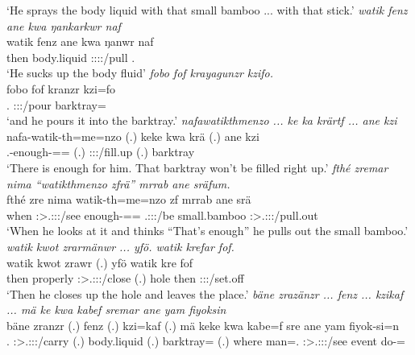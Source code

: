 \begin{exe}
	\trans `He sprays the body liquid with that small bamboo ... with that stick.'
	\emph{watik fenz ane kwa ŋankarkwr naf}\\
	\gll watik fenz ane kwa ŋanwr naf\\
	then body.liquid {\Dem} {\Fut} \Stsg:\Sbj:\Nonpast:\Ipfv:\Venit/pull \Tsg.{\Erg}\\
	\trans `He sucks up the body fluid'
	\emph{fobo fof krayagunzr kzifo.}\\
	\gll fobo fof kranzr kzi=fo\\
	\Dist.{\All} {\Emph} \Stsg:\Sbj:\Irr:\Ipfv/pour barktray={\All}\\
	\trans `and he pours it into the barktray.'
	\emph{nafawatikthmenzo ... ke ka krärtf ... ane kzi}\\
	\gll nafa-watik-th=me=nzo (.) keke kwa krä (.) ane kzi\\
	\Third.\Poss-enough-\Adlzr=\Ins={\Only} (.) {\Neg} {\Fut} \Stsg:\Obj:\Irr:\Ipfv/fill.up (.) {\Dem} barktray\\
	\trans `There is enough for him. That barktray won't be filled right up.'
	\emph{fthé zremar nima ``watikthmenzo zfrä'' mrrab ane sräfum.}\\
	\gll fthé zre nima watik-th=me=nzo zf mrrab ane srä\\
	when \Stsg:\Sbj>\Tsg.\F:\Obj:\Irr:\Pfv/see {\Quot} enough-\Adlzr=\Ins={\Only} \Tsg.\F:\Sbj:\Rpst:\Ipfv/be small.bamboo {\Dem} \Stsg:\Sbj>\Tsg.\Masc:\Obj:\Irr:\Ipfv/pull.out\\
	\trans `When he looks at it and thinks ``That's enough'' he pulls out the small bamboo.'
	\emph{watik kwot zrarmänwr ... yfö. watik krefar fof.}\\
	\gll watik kwot zrawr (.) yfö watik kre fof\\
	then properly \Stsg:\Sbj>\Tsg.\F:\Obj:\Irr:\Ipfv/close (.) hole then \Stsg:\Sbj:\Irr:\Pfv/set.off {\Emph}\\
	\trans `Then he closes up the hole and leaves the place.'
	\emph{bäne zrazänzr ... fenz ... kzikaf ... mä ke kwa kabef sremar ane yam fiyoksin}\\
	\gll bäne zranzr (.) fenz (.) kzi=kaf (.) mä keke kwa kabe=f sre ane yam fiyok-si=n\\
	\Recog.{\Abs} \Stsg:\Sbj>\Tsg.\F:\Obj:\Irr:\Ipfv/carry (.) body.liquid (.) barktray={\Prop} (.) where {\Neg} {\Fut} man=\Erg.{\Sg} \Stsg:\Sbj>\Tsg.\Masc:\Obj:\Irr:\Pfv/see {\Dem} event do-\Nmlz={\Loc}\\

\end{exe}
